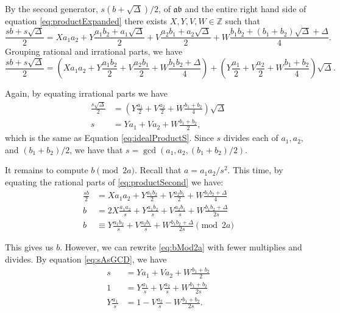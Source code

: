 \documentclass{ucalgthes1}
\theoremstyle{definition}
\newcommand{\ZZ}{\mathbb{Z}}
\begin{document}
By the second generator, $s(b+\sqrt\Delta)/2$, of $\mathfrak{a}\mathfrak{b}$ and the entire right hand side of equation \eqref{eq:productExpanded} there exists $X, Y, V, W \in \ZZ$ such that
\[
\frac{sb+s\sqrt\Delta}{2} = Xa_1a_2 + Y\frac{a_1b_2+a_1\sqrt\Delta}{2} + V\frac{a_2b_1 + a_2\sqrt{\Delta}}{2} + W\frac{b_1b_2 + (b_1+b_2)\sqrt{\Delta} + \Delta}{4}.
\]
Grouping rational and irrational parts, we have
\begin{equation}
\label{eq:productSecond}
\frac{sb+s\sqrt\Delta}{2} = \left( Xa_1a_2 + Y\frac{a_1b_2}{2} + V\frac{a_2b_1}{2} + W\frac{b_1b_2 + \Delta}{4} \right) + \left(Y\frac{a_1}{2} + V\frac{a_2}{2} + W\frac{b_1+b_2}{4}\right)\sqrt\Delta. 
\end{equation}

\noindent
Again, by equating irrational parts we have
\begin{align}
	\frac{s\sqrt\Delta}{2} & = \left(Y\frac{a_1}{2} + V\frac{a_2}{2} + W\frac{b_1+b_2}{4}\right)\sqrt\Delta \nonumber \\
	s & = Ya_1 + Va_2 + W\frac{b_1+b_2}{2}, \label{eq:sAsGCD}
\end{align}
which is the same as Equation \ref{eq:idealProductS}.  Since $s$ divides each of $a_1, a_2,$ and $(b_1+b_2)/2$, we have that $s = \gcd(a_1, a_2, (b_1+b_2)/2)$.

It remains to compute $b \pmod{2a}$.  Recall that $a = a_1a_2/s^2$.  This time, by equating the rational parts of \eqref{eq:productSecond} we have:
\begin{align}
	\frac{sb}{2} & = Xa_1a_2 + Y\frac{a_1b_2}{2} + V\frac{a_2b_1}{2} + W\frac{b_1b_2 + \Delta}{4} \nonumber \\
	b & = 2X\frac{a_1a_2}{s} + Y\frac{a_1b_2}{s} + V\frac{a_2b_1}{s} + W\frac{b_1b_2 + \Delta}{2s} \nonumber \\
	b & \equiv Y\frac{a_1b_2}{s} + V\frac{a_2b_1}{s} + W\frac{b_1b_2 + \Delta}{2s} \pmod{2a} \label{eq:bMod2a}
\end{align}

\noindent
This gives us $b$.  However, we can rewrite \eqref{eq:bMod2a} with fewer multiplies and divides.  By equation \eqref{eq:sAsGCD}, we have
\begin{align*}
	s & = Ya_1 + Va_2 + W\frac{b_1+b_2}{2} \\
	1 & = Y\frac{a_1}{s} + V\frac{a_2}{s} + W\frac{b_1+b_2}{2s} \\
	Y\frac{a_1}{s} & = 1 - V\frac{a_2}{s} - W\frac{b_1+b_2}{2s}.
\end{align*}
\end{document}
